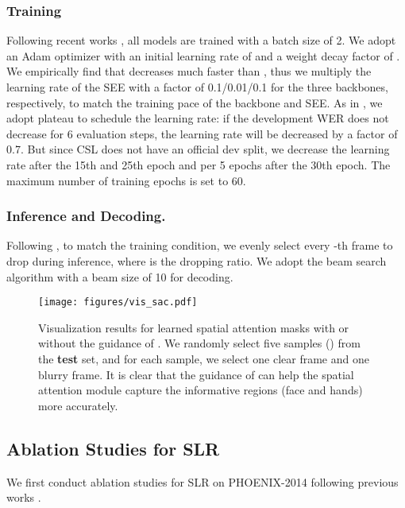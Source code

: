 \documentclass[acmsmall,screen]{acmart}
\def \tbf{\textbf}
\begin{document}
\subsubsection{Training}
Following recent works \cite{self-mutual, vac, stmc}, all models are trained with a batch size of 2.
We adopt an Adam optimizer \cite{adam} with an initial learning rate of  and a weight decay factor of .
We empirically find that  decreases much faster than , thus we multiply the learning rate of the SEE with a factor of 0.1/0.01/0.1 for the three backbones, respectively, to match the training pace of the backbone and SEE.
As in \cite{slt}, we adopt plateau to schedule the learning rate: if the development WER does not decrease for 6 evaluation steps, the learning rate will be decreased by a factor of 0.7.
But since CSL does not have an official dev split, we decrease the learning rate after the 15th and 25th epoch and per 5 epochs after the 30th epoch.
The maximum number of training epochs is set to 60.

\subsubsection{Inference and Decoding.}
Following \cite{sfl}, to match the training condition, we evenly select every -th frame to drop during inference, where  is the dropping ratio.
We adopt the beam search algorithm with a beam size of 10 for decoding.
















\begin{figure*}[t]
  \centering
   \texttt{[image: figures/vis\_sac.pdf]}
   \caption{Visualization results for learned spatial attention masks with or without the guidance of . We randomly select five samples () from the \tbf{test} set, and for each sample, we select one clear frame and one blurry frame. It is clear that the guidance of  can help the spatial attention module capture the informative regions (face and hands) more accurately.}
   \label{fig:vis_sac}
\end{figure*}

\subsection{Ablation Studies for SLR}
We first conduct ablation studies for SLR on PHOENIX-2014 following previous works \cite{vac, stmc, cma, self-mutual}.
\end{document}
